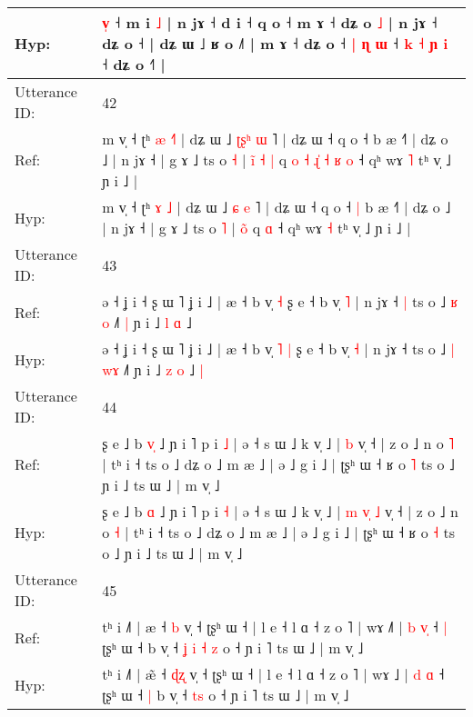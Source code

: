 \documentclass[10pt]{article}
\DeclareRobustCommand{\hl}[1]{{\textcolor{red}{#1}}}
\begin{document}
\begin{longtable}{ll}
 \\
Hyp: & \hl{v}\hl{̩} ˧ m i \hl{˩} | n jɤ ˧ d i ˧ q o ˧ m ɤ ˧ dʑ o\hl{}\hl{}\hl{}\hl{}\hl{}\hl{}\hl{} \hl{˩} | n jɤ ˧ dʑ o ˧ | dʑ ɯ ˩ ʁ o ˩˥ | m ɤ ˧ dʑ o ˧ \hl{|} \hl{ɳ}\hl{ }\hl{ɯ} ˧ \hl{k} \hl{˧} \hl{ɲ}\hl{ }\hl{i} ˧ dʑ o ˧\hl{˥} |
 \\
\midrule
Utterance ID: & 42 \\
Ref: & m v̩ ˧ ʈʰ \hl{æ} \hl{˧}\hl{˥} | dʑ ɯ ˩ \hl{ʈ}\hl{ʂ}\hl{ʰ} \hl{ɯ} ˥ | dʑ ɯ ˧ q o ˧\hl{}\hl{} b æ ˧˥ | dʑ o ˩ | n jɤ ˧ | g ɤ ˩ ts o \hl{˧} | \hl{i}̃\hl{ }\hl{˧}\hl{ }\hl{|} q\hl{ }\hl{o}\hl{ }\hl{˧}\hl{ }\hl{ɻ}\hl{̍}\hl{ }\hl{˧}\hl{ }\hl{ʁ} \hl{o} ˧ qʰ wɤ \hl{˥} tʰ v̩ ˩ ɲ i ˩ |
 \\
Hyp: & m v̩ ˧ ʈʰ \hl{ɤ} \hl{}\hl{˩} | dʑ ɯ ˩ \hl{}\hl{}\hl{ɕ} \hl{e} ˥ | dʑ ɯ ˧ q o ˧\hl{ }\hl{|} b æ ˧˥ | dʑ o ˩ | n jɤ ˧ | g ɤ ˩ ts o \hl{˥} | \hl{o}̃\hl{}\hl{}\hl{}\hl{} q\hl{}\hl{}\hl{}\hl{}\hl{}\hl{}\hl{}\hl{}\hl{}\hl{}\hl{} \hl{ɑ} ˧ qʰ wɤ \hl{˧} tʰ v̩ ˩ ɲ i ˩ |
 \\
\midrule
Utterance ID: & 43 \\
Ref: & ə ˧ ʝ i ˧ ʂ ɯ ˥ ʝ i ˩ | æ ˧ b v̩\hl{}\hl{} \hl{˧} ʂ e ˧ b v̩ \hl{˥} | n jɤ ˧\hl{ }\hl{|} ts o ˩ \hl{ʁ} \hl{}\hl{o} ˩˥\hl{ }\hl{|} ɲ i ˩ \hl{l} \hl{ɑ} ˩\hl{}\hl{}
 \\
Hyp: & ə ˧ ʝ i ˧ ʂ ɯ ˥ ʝ i ˩ | æ ˧ b v̩\hl{ }\hl{˥} \hl{|} ʂ e ˧ b v̩ \hl{˧} | n jɤ ˧\hl{}\hl{} ts o ˩ \hl{|} \hl{w}\hl{ɤ} ˩˥\hl{}\hl{} ɲ i ˩ \hl{z} \hl{o} ˩\hl{ }\hl{|}
 \\
\midrule
Utterance ID: & 44 \\
Ref: & ʂ e ˩ b \hl{v}\hl{̩} ˩ ɲ i ˥ p i \hl{˩} | ə ˧ s ɯ ˩ k v̩ ˩ |\hl{}\hl{}\hl{}\hl{}\hl{} \hl{b} v̩ ˧ | z o ˩ n o \hl{˥} | tʰ i ˧ ts o ˩ dʑ o ˩ m æ ˩ | ə ˩ g i ˩ | ʈʂʰ ɯ ˧ ʁ o \hl{˥} ts o ˩ ɲ i ˩ ts ɯ ˩ | m v̩ ˩
 \\
Hyp: & ʂ e ˩ b \hl{}\hl{ɑ} ˩ ɲ i ˥ p i \hl{˧} | ə ˧ s ɯ ˩ k v̩ ˩ |\hl{ }\hl{m}\hl{ }\hl{v}\hl{̩} \hl{˩} v̩ ˧ | z o ˩ n o \hl{˧} | tʰ i ˧ ts o ˩ dʑ o ˩ m æ ˩ | ə ˩ g i ˩ | ʈʂʰ ɯ ˧ ʁ o \hl{˧} ts o ˩ ɲ i ˩ ts ɯ ˩ | m v̩ ˩
 \\
\midrule
Utterance ID: & 45 \\
Ref: & tʰ i ˩˥ | æ\hl{} ˧ \hl{}\hl{b} v̩ ˧ ʈʂʰ ɯ ˧ | l e ˧ l ɑ ˧ z o ˥ | wɤ ˩\hl{˥} | \hl{b} \hl{v}\hl{̩} ˧\hl{ }\hl{|} ʈʂʰ ɯ ˧\hl{}\hl{} b v̩ ˧\hl{ }\hl{ʝ}\hl{ }\hl{i} \hl{˧}\hl{ }\hl{z} o ˧ ɲ i ˥ ts ɯ ˩ | m v̩ ˩
 \\
Hyp: & tʰ i ˩˥ | æ\hl{̃} ˧ \hl{ɖ}\hl{ʐ} v̩ ˧ ʈʂʰ ɯ ˧ | l e ˧ l ɑ ˧ z o ˥ | wɤ ˩\hl{} | \hl{d} \hl{}\hl{ɑ} ˧\hl{}\hl{} ʈʂʰ ɯ ˧\hl{ }\hl{|} b v̩ ˧\hl{}\hl{}\hl{}\hl{} \hl{}\hl{t}\hl{s} o ˧ ɲ i ˥ ts ɯ ˩ | m v̩ ˩

\end{longtable}
\end{document}
